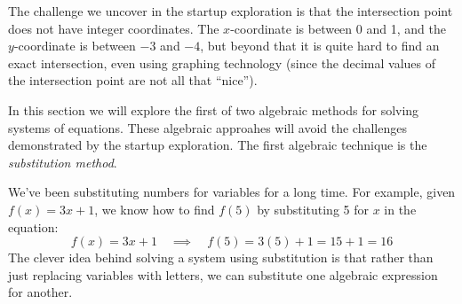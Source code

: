 The challenge we uncover in the startup exploration is that the intersection point does not have integer coordinates. The $x$-coordinate is between 0 and 1, and the $y$-coordinate is between $-3$ and $-4$, but beyond that it is quite hard to find an exact intersection, even using graphing technology (since the decimal values of the intersection point are not all that ``nice'').

\begin{center}
\end{center}


In this section we will explore the first of two algebraic methods for solving systems of equations. These algebraic approahes will avoid the challenges demonstrated by the startup exploration. The first algebraic technique is the \textit{substitution method}.

We've been substituting numbers for variables for a long time. For example, given $f(x) = 3x + 1$, we know how to find $f(5)$ by substituting 5 for $x$ in the equation: \[f(x) = 3x+1 \quad\implies\quad f(5) = 3(5)+1 = 15 + 1 = 16\] The clever idea behind solving a system using substitution is that rather than just replacing variables with letters, we can substitute one algebraic expression for another.

